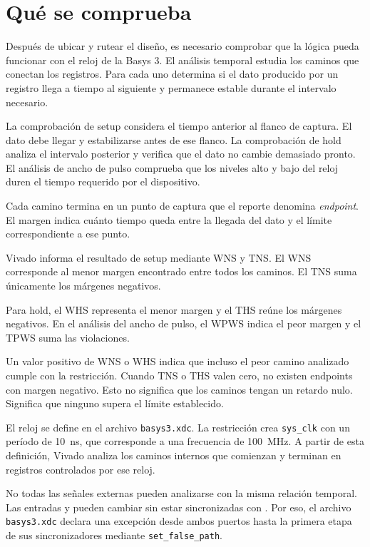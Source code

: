 \section{Qué se comprueba}

Después de ubicar y rutear el diseño, es necesario comprobar que la
lógica pueda funcionar con el reloj de la Basys 3. El análisis
temporal estudia los caminos que conectan los registros. Para cada
uno determina si el dato producido por un registro llega a tiempo al
siguiente y permanece estable durante el intervalo necesario.

La comprobación de setup considera el tiempo anterior al flanco de
captura. El dato debe llegar y estabilizarse antes de ese flanco. La
comprobación de hold analiza el intervalo posterior y verifica que el
dato no cambie demasiado pronto. El análisis de ancho de pulso
comprueba que los niveles alto y bajo del reloj duren el tiempo
requerido por el dispositivo.

Cada camino termina en un punto de captura que el reporte denomina
\emph{endpoint}. El margen indica cuánto tiempo queda entre la
llegada del dato y el límite correspondiente a ese punto.

Vivado informa el resultado de setup mediante WNS y TNS. El WNS
corresponde al menor margen encontrado entre todos los caminos. El
TNS suma únicamente los márgenes negativos.

Para hold, el WHS representa el menor margen y el THS reúne los
márgenes negativos. En el análisis del ancho de pulso, el WPWS indica
el peor margen y el TPWS suma las violaciones.

Un valor positivo de WNS o WHS indica que incluso el peor camino
analizado cumple con la restricción. Cuando TNS o THS valen cero, no
existen endpoints con margen negativo. Esto no significa que los
caminos tengan un retardo nulo. Significa que ninguno supera el
límite establecido.

El reloj se define en el archivo \texttt{basys3.xdc}. La restricción
crea \texttt{sys\_clk} con un período de \SI{10}{\nano\second}, que
corresponde a una frecuencia de \SI{100}{\mega\hertz}. A partir de
esta definición, Vivado analiza los caminos internos que comienzan y
terminan en registros controlados por ese reloj.

No todas las señales externas pueden analizarse con la misma relación
temporal. Las entradas {\color{technicalviolet}} y
{\color{technicalviolet}} pueden cambiar sin estar
sincronizadas con {\color{technicalviolet}}. Por eso,
el archivo \texttt{basys3.xdc} declara una excepción desde ambos
puertos hasta la primera etapa de sus sincronizadores mediante
\texttt{set\_false\_path}.


